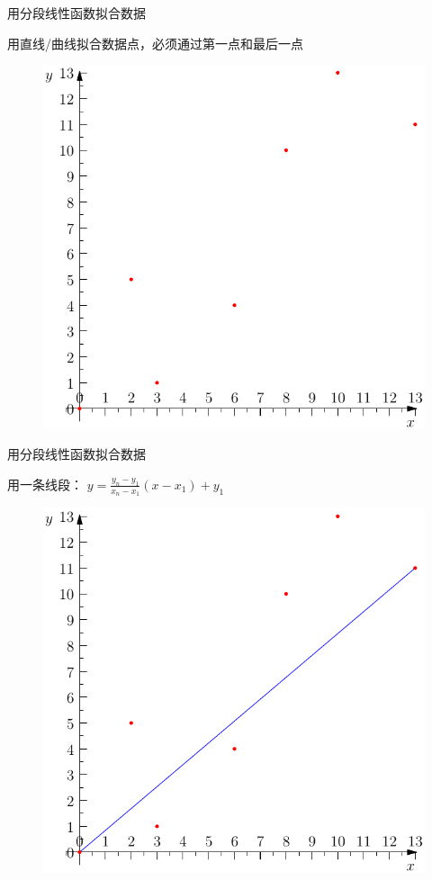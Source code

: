 \documentclass[UTF8]{ctexbeamer}
\begin{document}
\begin{frame}{用分段线性函数拟合数据}
  \begin{block}{}
    用直线/曲线拟合数据点，必须通过第一点和最后一点
  \end{block}
  \begin{figure}
    \centering
    \includegraphics[width=.5\textwidth]{data.pdf}
  \end{figure}
\end{frame}

\begin{frame}{用分段线性函数拟合数据}
  \begin{block}{}
    用一条线段： $y=\frac{y_n-y_1}{x_n-x_1}(x-x_1) + y_1$
  \end{block}
  \begin{figure}
    \centering
    \includegraphics[width=.5\textwidth]{line.pdf}
  \end{figure}
\end{frame}
\end{document}
